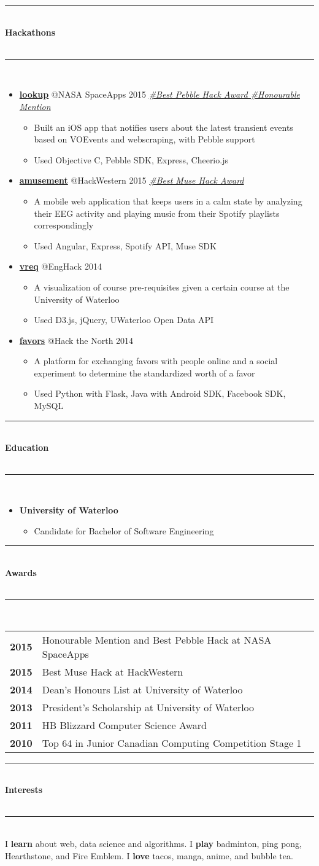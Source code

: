 \documentclass[10pt]{article}
\makeatletter
\newcommand{\cvsectiontitle}[1]{%
	\rule{\linewidth}{0.2mm}\\%
		{\large\indent\textbf{#1}}\\%
	\\[-6.5mm]\rule{\linewidth}{0.2mm}\\[2mm]%
	}
\newcommand{\cvhackathonproject}[4]{\href{#2}{\textbf{#1}} @{#3} \color{BrickRed}\textit{#4} \color{Black}}
\newcommand{\cveducation}[2]{\textbf{#1} \hspace{\stretch{3}}{#2}}
\newcommand{\cvaward}[2]{\textbf{#1} & {#2}}
\newcommand{\cvsublevel}[1]{\begin{itemize}[leftmargin=0.5cm] #1\end{itemize}}
\newcommand{\cvsubbullet}[1]{\vspace{-1mm}\item #1}
\makeatother
\begin{document}
\vspace{-2.5mm}
\cvsectiontitle{Hackathons}
\vspace{-0.8cm}
\begin{itemize}[leftmargin=0.5cm]
\item \cvhackathonproject{lookup}{https://github.com/Clemmy/lookup}{NASA SpaceApps 2015}{\href{https://twitter.com/SpaceAppsTO/status/587444439276191744}{\#Best Pebble Hack Award \#Honourable Mention}}\cvsublevel{
	\cvsubbullet{Built an iOS app that notifies users about the latest transient events based on VOEvents and webscraping, with Pebble support}
	\cvsubbullet{Used Objective C, Pebble SDK, Express, Cheerio.js}
}
\item \cvhackathonproject{amusement}{https://github.com/Clemmy/amusement}{HackWestern 2015}{\href{http://challengepost.com/software/amusement-um9im}{\#Best Muse Hack Award}}\cvsublevel{
	\cvsubbullet{A mobile web application that keeps users in a calm state by analyzing their EEG activity and playing music from their Spotify playlists correspondingly}
	\cvsubbullet{Used Angular, Express, Spotify API, Muse SDK}
}
\item \cvhackathonproject{vreq}{https://github.com/jasonf7/VReq}{EngHack 2014}{}\cvsublevel{
	\cvsubbullet{A visualization of course pre-requisites given a certain course at the University of Waterloo}
	\cvsubbullet{Used D3.js, jQuery, UWaterloo Open Data API}
}
\item \cvhackathonproject{favors}{https://github.com/raywan/favors}{Hack the North 2014}{}\cvsublevel{
	\cvsubbullet{A platform for exchanging favors with people online and a social experiment to determine the standardized worth of a favor}
	\cvsubbullet{Used Python with Flask, Java with Android SDK, Facebook SDK, MySQL}
}
\end{itemize}

\vspace{-2.5mm}
\cvsectiontitle{Education}
\vspace{-0.8cm}
\begin{itemize}[leftmargin=0.5cm]
\item \cveducation{University of Waterloo}{September 2013 - May 2018}\cvsublevel{
	\cvsubbullet{Candidate for Bachelor of Software Engineering}
}
\end{itemize}

\vspace{-2.5mm}
\cvsectiontitle{Awards}
\begin{tabular}{ c l }
	\cvaward{2015}{Honourable Mention and Best Pebble Hack at NASA SpaceApps} \\
	\cvaward{2015}{Best Muse Hack at HackWestern} \\
	\cvaward{2014}{Dean's Honours List at University of Waterloo} \\
	\cvaward{2013}{President's Scholarship at University of Waterloo} \\
	\cvaward{2011}{HB Blizzard Computer Science Award} \\
	\cvaward{2010}{Top 64 in Junior Canadian Computing Competition Stage 1}
\end{tabular}

\vspace{2mm}
\cvsectiontitle{Interests}
I \textbf{learn} about web, data science and algorithms.
I \textbf{play} badminton, ping pong, Hearthstone, and Fire Emblem.
I \textbf{love} tacos, manga, anime, and bubble tea.
\end{document}
